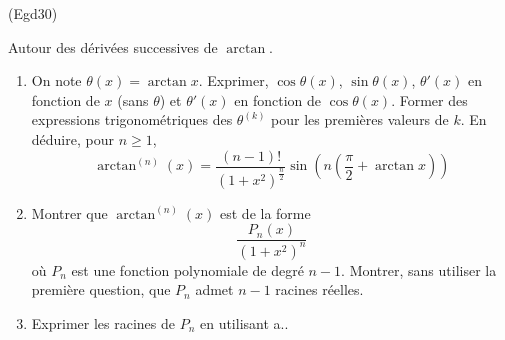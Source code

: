 \begin{tiny}(Egd30)\end{tiny} Autour des dérivées successives de $\arctan$.
\begin{enumerate}
  \item On note $\theta(x) = \arctan x$.\newline
  Exprimer, $\cos \theta(x)$, $\sin \theta(x)$, $\theta'(x)$ en fonction de $x$ (sans $\theta$) et $\theta'(x)$ en fonction de $\cos \theta(x)$. Former des expressions trigonométriques des $\theta^{(k)}$ pour les premières valeurs de $k$. En déduire, pour $n\geq 1$,  
\begin{displaymath}
\arctan^{(n)}(x) = \frac{(n-1)!}{(1+x^2)^{\frac{n}{2}}}\sin\left(n( \frac{\pi}{2} + \arctan x ) \right) 
\end{displaymath}
\item Montrer que $\arctan^{(n)}(x)$ est de la forme
\begin{displaymath}
  \frac{P_n(x)}{(1+x^2)^n}
\end{displaymath}
où $P_n$ est une fonction polynomiale de degré $n-1$. Montrer, sans utiliser la première question, que $P_n$ admet $n-1$ racines réelles. 
\item Exprimer les racines de $P_n$ en utilisant a..
\end{enumerate}
